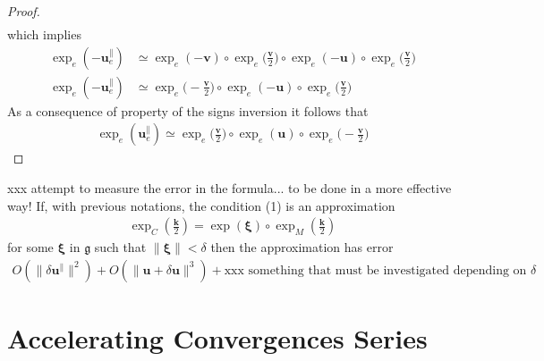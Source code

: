 \begin{proof}
\begin{align*}
	\end{align*}
	which implies
	\begin{align*}
	\exp_{e}(-\mathbf{u}_{e}^{\parallel}) 
	&\simeq
	\exp_{e}(-\mathbf{v}) 
	\circ \exp_{e}\big(\frac{\mathbf{v}}{2}\big)   
	\circ  \exp_{e}(-\mathbf{u}) 
	\circ \exp_{e}\big(\frac{\mathbf{v}}{2}\big)
	\\
	\exp_{e}(-\mathbf{u}_{e}^{\parallel}) 
	&\simeq
	\exp_{e}\big(-\frac{\mathbf{v}}{2}\big)   
	\circ  \exp_{e}(-\mathbf{u}) 
	\circ \exp_{e}\big(\frac{\mathbf{v}}{2}\big)
	\end{align*}
	As a consequence of property of the signs inversion it follows that
	\begin{align*}
	\exp_{e}(\mathbf{u}_{e}^{\parallel}) 
	\simeq
	\exp_{e}\big(\frac{\mathbf{v}}{2}\big)   
	\circ  \exp_{e}(\mathbf{u}) 
	\circ \exp_{e}\big(-\frac{\mathbf{v}}{2}\big)
	\end{align*}
\end{proof} 

\begin{corollary}
	xxx attempt to measure the error in the formula... to be done in a more effective way!
	If, with previous notations, the condition (1) is an approximation
	\begin{align*}
	\exp_{C}(\frac{\mathbf{k}}{2}) = \exp(\mathbf{\xi})\circ \exp_{M}(\frac{\mathbf{k}}{2}) 
	\end{align*}
	for some $ \mathbf{\xi}$ in  $\mathfrak{g}$ such that $\parallel\mathbf{\xi} \parallel < \delta$
	then the approximation has error
	\begin{align*}
	O(\parallel \delta\mathbf{u}^{\parallel} \parallel^{2} )  
	+ O(\parallel \mathbf{u} + \delta\mathbf{u}\parallel^{3})
	+ \text{xxx something that must be investigated depending on } \delta
	\end{align*}
\end{corollary}




\section{Accelerating Convergences Series}\label{se:accelerating}

